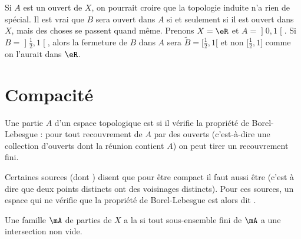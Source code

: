 \begin{example} \label{ExloeyoR}
    Si \( A\) est un ouvert de \( X\), on pourrait croire que la topologie induite n'a rien de spécial. Il est vrai que \( B\) sera ouvert dans \( A\) si et seulement si il est ouvert dans \( X\), mais des choses se passent quand même. Prenons \( X=\eR\) et \( A=\mathopen] 0 , 1 \mathclose[\). Si \( B=\mathopen] \frac{ 1 }{2} , 1 \mathclose[ \), alors la fermeture de \( B\) dans \( A\) sera \( \tilde B=\mathopen[ \frac{ 1 }{2} , 1 [\) et non \( \mathopen[ \frac{ 1 }{2} , 1 \mathclose]\) comme on l'aurait dans \( \eR\).
\end{example}

\section{Compacité}

\begin{definition}
  Une partie $A$ d'un espace topologique est  si il vérifie la propriété de Borel-Lebesgue : pour tout recouvrement de $A$ par des ouverts (c'est-à-dire une collection d'ouverts dont la réunion contient $A$) on peut tirer un recouvrement fini.
\end{definition}
\begin{remark}
    Certaines sources (dont ) disent que pour être compact il faut aussi être  (c'est à dire que deux points distincts ont des voisinages distincts). Pour ces sources, un espace qui ne vérifie que la propriété de Borel-Lebesgue est alors dit .
\end{remark}

\begin{definition}
    Une famille \( \mA\) de parties de \( X\) a la  si tout sous-ensemble fini de \( \mA\) a une intersection non vide.
\end{definition}

